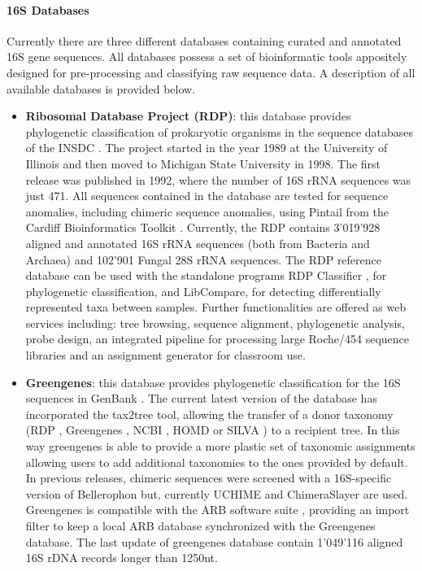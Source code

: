 \paragraph{16S Databases}
Currently there are three different databases containing curated and annotated 16S gene sequences. All databases possess a set of bioinformatic tools appositely designed for pre-processing and classifying raw sequence data. A description of all available databases is provided below.\\
\begin{itemize}
\item \textbf{Ribosomal Database Project (RDP)}: this database provides phylogenetic classification of prokaryotic organisms in the sequence databases of the INSDC \cite{maidak2001rdp}. The project started in the year 1989 at the University of Illinois and then moved to Michigan State University in 1998. The first release was published in 1992, where the number of 16S rRNA sequences was just 471. All sequences contained in the database are tested for sequence anomalies, including chimeric sequence anomalies, using Pintail from the Cardiff Bioinformatics Toolkit \cite{ashelford2005least}. Currently, the RDP contains  3'019'928 aligned and annotated 16S rRNA sequences (both from Bacteria and Archaea) and 102'901 Fungal 28S rRNA sequences. The RDP reference database can be used with the standalone programs RDP Classifier \cite{wang2007naive}, for phylogenetic classification, and LibCompare, for detecting differentially represented taxa between samples. Further functionalities are offered as web services including: tree browsing, sequence alignment, phylogenetic analysis, probe design, an integrated pipeline for processing large Roche/454 sequence libraries and an assignment generator for classroom use.

\item \textbf{Greengenes}: this database provides phylogenetic classification for the 16S sequences in GenBank \cite{desantis2006greengenes}. The current latest version of the database has incorporated the tax2tree tool, allowing the transfer of a donor taxonomy (RDP \cite{maidak2001rdp}, Greengenes \cite{desantis2006greengenes}, NCBI \cite{tatusova2013refseq}, HOMD \cite{chen2010human} or SILVA \cite{quast2012silva}) to a recipient tree. In this way greengenes is able to provide a more plastic set of taxonomic assignments allowing users to add additional taxonomies to the ones provided by default. In previous releases, chimeric sequences were screened with a 16S-specific version of Bellerophon \cite{huber2004bellerophon} but, currently UCHIME \cite{edgar2011uchime} and ChimeraSlayer \cite{haas2011chimeric} are used. Greengenes is compatible with the ARB software suite \cite{ludwig2004arb}, providing an import filter to keep a local ARB database synchronized with the Greengenes database. The last update of greengenes database contain 1'049'116 aligned 16S rDNA records longer than 1250nt.


\end{itemize}
